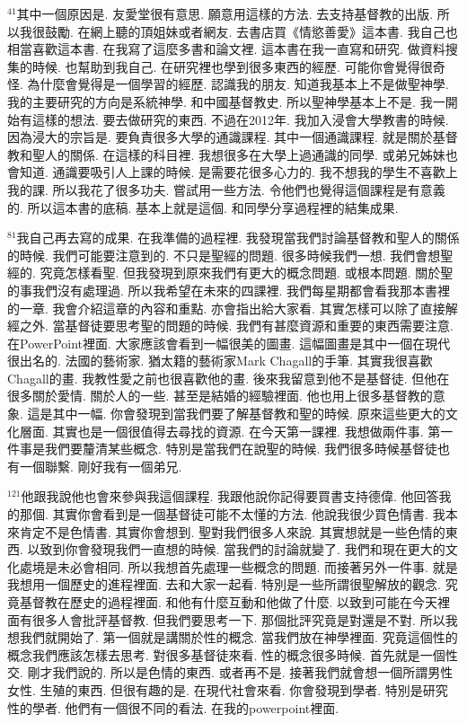 \documentclass{book}
\begin{document}
$^{41}$其中一個原因是.
友愛堂很有意思.
願意用這樣的方法.
去支持基督教的出版.
所以我很鼓勵.
在網上聽的頂姐妹或者網友.
去書店買《情慾善愛》這本書.
我自己也相當喜歡這本書.
在我寫了這麼多書和論文裡.
這本書在我一直寫和研究.
做資料搜集的時候.
也幫助到我自己.
在研究裡也學到很多東西的經歷.
可能你會覺得很奇怪.
為什麼會覺得是一個學習的經歷.
認識我的朋友.
知道我基本上不是做聖神學.
我的主要研究的方向是系統神學.
和中國基督教史.
所以聖神學基本上不是.
我一開始有這樣的想法.
要去做研究的東西.
不過在2012年.
我加入浸會大學教書的時候.
因為浸大的宗旨是.
要負責很多大學的通識課程.
其中一個通識課程.
就是關於基督教和聖人的關係.
在這樣的科目裡.
我想很多在大學上過通識的同學.
或弟兄姊妹也會知道.
通識要吸引人上課的時候.
是需要花很多心力的.
我不想我的學生不喜歡上我的課.
所以我花了很多功夫.
嘗試用一些方法.
令他們也覺得這個課程是有意義的.
所以這本書的底稿.
基本上就是這個.
和同學分享過程裡的結集成果.

$^{81}$我自己再去寫的成果.
在我準備的過程裡.
我發現當我們討論基督教和聖人的關係的時候.
我們可能要注意到的.
不只是聖經的問題.
很多時候我們一想.
我們會想聖經的.
究竟怎樣看聖.
但我發現到原來我們有更大的概念問題.
或根本問題.
關於聖的事我們沒有處理過.
所以我希望在未來的四課裡.
我們每星期都會看我那本書裡的一章.
我會介紹這章的內容和重點.
亦會指出給大家看.
其實怎樣可以除了直接解經之外.
當基督徒要思考聖的問題的時候.
我們有甚麼資源和重要的東西需要注意.
在PowerPoint裡面.
大家應該會看到一幅很美的圖畫.
這幅圖畫是其中一個在現代很出名的.
法國的藝術家.
猶太籍的藝術家Mark Chagall的手筆.
其實我很喜歡Chagall的畫.
我教性愛之前也很喜歡他的畫.
後來我留意到他不是基督徒.
但他在很多關於愛情.
關於人的一些.
甚至是結婚的經驗裡面.
他也用上很多基督教的意象.
這是其中一幅.
你會發現到當我們要了解基督教和聖的時候.
原來這些更大的文化層面.
其實也是一個很值得去尋找的資源.
在今天第一課裡.
我想做兩件事.
第一件事是我們要釐清某些概念.
特別是當我們在說聖的時候.
我們很多時候基督徒也有一個聯繫.
剛好我有一個弟兄.

$^{121}$他跟我說他也會來參與我這個課程.
我跟他說你記得要買書支持德偉.
他回答我的那個.
其實你會看到是一個基督徒可能不太懂的方法.
他說我很少買色情書.
我本來肯定不是色情書.
其實你會想到.
聖對我們很多人來說.
其實想就是一些色情的東西.
以致到你會發現我們一直想的時候.
當我們的討論就變了.
我們和現在更大的文化處境是未必會相同.
所以我想首先處理一些概念的問題.
而接著另外一件事.
就是我想用一個歷史的進程裡面.
去和大家一起看.
特別是一些所謂很聖解放的觀念.
究竟基督教在歷史的過程裡面.
和他有什麼互動和他做了什麼.
以致到可能在今天裡面有很多人會批評基督教.
但我們要思考一下.
那個批評究竟是對還是不對.
所以我想我們就開始了.
第一個就是講關於性的概念.
當我們放在神學裡面.
究竟這個性的概念我們應該怎樣去思考.
對很多基督徒來看.
性的概念很多時候.
首先就是一個性交.
剛才我們說的.
所以是色情的東西.
或者再不是.
接著我們就會想一個所謂男性女性.
生殖的東西.
但很有趣的是.
在現代社會來看.
你會發現到學者.
特別是研究性的學者.
他們有一個很不同的看法.
在我的powerpoint裡面.
\end{document}
